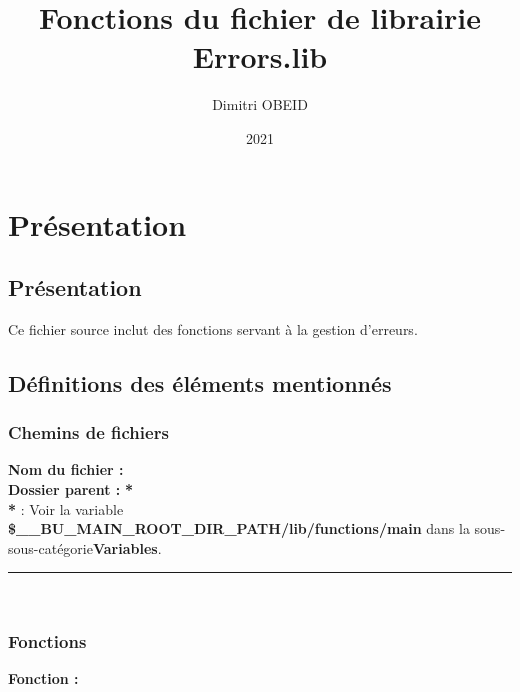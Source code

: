 \documentclass[a4paper,10pt]{article}
\title{\color{red}Fonctions du fichier de librairie \color{lime}Errors.lib}\color{white}
\author{Dimitri OBEID}
\date{2021}
\begin{document}
 \maketitle
 \tableofcontents
 \newpage

\color{red}
\section{Présentation}\color{white}

\color{green}
\subsection{Présentation}\color{white}
Ce fichier source inclut des fonctions servant à la gestion d'erreurs.\\[1\baselineskip]

\color{green}
\subsection{Définitions des éléments mentionnés}\color{white}

\color{blue}
\subsubsection{Chemins de fichiers}\color{white}
\textbf{Nom du fichier :} \textbf{\color{lime}\color{white}}\\[1\baselineskip]
\textbf{Dossier parent :} \textbf{\color{lime}\color{white}*}\\[1\baselineskip]

\textbf{*} : Voir la variable \textbf{\color{orange}\$\_\_BU\_MAIN\_ROOT\_DIR\_PATH/lib/functions/main\color{white}} dans la sous-sous-catégorie\linebreak \textbf{\color{blue}Variables\color{white}}.\\[1\baselineskip]



\color{lime}\par\noindent\rule{\textwidth}{0.4pt}\color{white}\\[1\baselineskip]


\color{blue}
\subsubsection{Fonctions}\color{white}
\textbf{Fonction :} \textbf{\color{mauve}\color{white}}\\[1\baselineskip]
\end{document}
